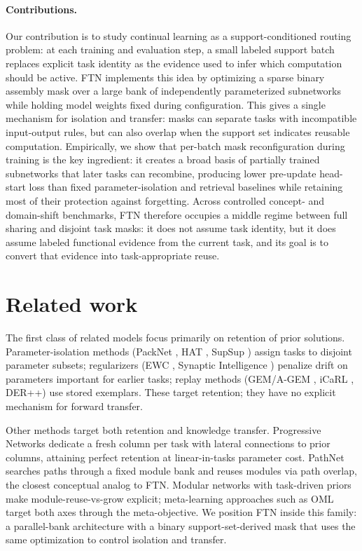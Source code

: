 \documentclass[11pt]{article}
\begin{document}
\paragraph{Contributions.}
Our contribution is to study continual learning as a support-conditioned routing problem: at each training and evaluation step, a small labeled support batch replaces explicit task identity as the evidence used to infer which computation should be active. FTN implements this idea by optimizing a sparse binary assembly mask over a large bank of independently parameterized subnetworks while holding model weights fixed during configuration. This gives a single mechanism for isolation and transfer: masks can separate tasks with incompatible input-output rules, but can also overlap when the support set indicates reusable computation. Empirically, we show that per-batch mask reconfiguration during training is the key ingredient: it creates a broad basis of partially trained subnetworks that later tasks can recombine, producing lower pre-update head-start loss than fixed parameter-isolation and retrieval baselines while retaining most of their protection against forgetting. Across controlled concept- and domain-shift benchmarks, FTN therefore occupies a middle regime between full sharing and disjoint task masks: it does not assume task identity, but it does assume labeled functional evidence from the current task, and its goal is to convert that evidence into task-appropriate reuse.

\section{Related work}\label{sec:related}

The first class of related models focus primarily on retention of prior solutions. Parameter-isolation methods (PackNet \citep{mallya2018packnet}, HAT \citep{serra2018overcoming}, SupSup \citep{wortsman2020supermasks}) assign tasks to disjoint parameter subsets; regularizers (EWC \citep{kirkpatrick2017overcoming}, Synaptic Intelligence \citep{zenke2017continual}) penalize drift on parameters important for earlier tasks; replay methods (GEM/A-GEM \citep{lopez2017gradient,chaudhry2018efficient}, iCaRL \citep{rebuffi2017icarl}, DER++) use stored exemplars. These target retention; they have no explicit mechanism for forward transfer.

Other methods target both retention and knowledge transfer. Progressive Networks \citep{rusu2016progressive} dedicate a fresh column per task with lateral connections to prior columns, attaining perfect retention at linear-in-tasks parameter cost. PathNet \citep{fernando2017pathnet} searches paths through a fixed module bank and reuses modules via path overlap, the closest conceptual analog to FTN. Modular networks with task-driven priors \citep{veniat2021mntdp} make module-reuse-vs-grow explicit; meta-learning approaches such as OML \citep{javed2019oml} target both axes through the meta-objective. We position FTN inside this family: a parallel-bank architecture with a binary support-set-derived mask that uses the same optimization to control isolation and transfer.
\end{document}
